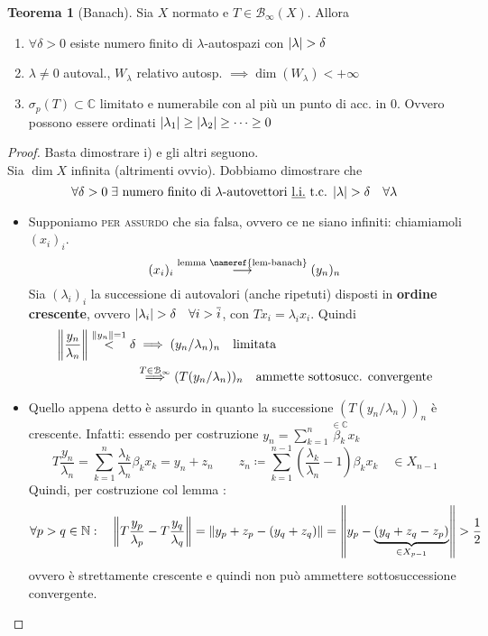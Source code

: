 \documentclass[a4paper,10pt]{article}
\theoremstyle{definition}
\newcommand{\na}{\mathbb{N}} %
\newcommand{\im}{\mathbb{C}} %
\newcommand{\noun}[1]{\textsc{#1}}
\theoremstyle{indentdefinition}
\theoremstyle{indenttheorem}
\newtheorem{thm}{Teorema}
\theoremstyle{myremark}
\theoremstyle{indentgeneral}
\newenvironment{myboxed} 
{\noindent\begin{lrbox}{\mybox}\begin{minipage}{\textwidth}}
{\end{minipage}\end{lrbox}\fbox{\usebox{\mybox}}}
\begin{document}
\begin{myboxed}
    \begin{thm}[Banach]\label{thm-banach}
        Sia $X$ normato e $T\in\mathcal{B}_\infty(X)$. Allora
        \begin{enumerate}
            \item $\forall\delta>0$ esiste numero finito di $\lambda$-autospazi con $\abs{\lambda}>\delta$
            \item $\lambda\ne 0$ autoval., $W_\lambda$ relativo autosp. $\implies \dim(W_\lambda)<+\infty$
            \item $\sigma_p(T)\subset \im$ limitato e numerabile con al più un punto di acc. in 0. Ovvero possono essere ordinati $\abs{\lambda_1}\ge\abs{\lambda_2}\ge\dots\ge 0$
        \end{enumerate}
    \end{thm}
\end{myboxed}

\begin{proof} Basta dimostrare i) e gli altri seguono. \\
     Sia $\dim X$ infinita (altrimenti ovvio). Dobbiamo dimostrare che
        $$\forall\delta>0\;\exists \text{  numero finito di $\lambda$-autovettori \underline{l.i.} t.c. }\abs{\lambda}>\delta\quad \forall\lambda$$
        \begin{itemize}
            \item  Supponiamo \noun{per assurdo} che sia falsa, ovvero ce ne siano infiniti: chiamiamoli $(x_i)_i$. 
        $$(x_i)_i\overset{\text{lemma \nameref{lem-banach}}}{\longrightarrow}(y_n)_n$$
        Sia $(\lambda_i)_i$ la successione di autovalori (anche ripetuti) disposti in \textbf{ordine crescente}, ovvero $\abs{\lambda_i}>\delta \quad \forall i>\overline{i}$, con 
$Tx_i=\lambda_ix_i$. Quindi
        \begin{align*}
            \norm{\frac{y_n}{\lambda_n}}\overset{\norm{y_n}=1}{<}\delta&\implies (y_n/\lambda_n)_n \quad \text{limitata}\\
            &\overset{T \in\mathcal{B}_\infty}{\implies} (T(y_n/\lambda_n))_n \quad \text{ammette sottosucc. convergente}
        \end{align*}
        \item Quello appena detto è assurdo in quanto la successione $(T(y_n/\lambda_n))_n$ è crescente. Infatti: essendo per costruzione $y_n=\sum_{k=1}^n\overset{\in \im}{\beta_k}x_k$
        $$T\frac{y_n}{\lambda_n}=\sum_{k=1}^n\frac{\lambda_k}{\lambda_n}\beta_kx_k=y_n+z_n \qquad z_n\coloneqq\sum_{k=1}^{n-1}\left(\frac{\lambda_k}{\lambda_n}-1\right)\beta_kx_k\quad\in X_{n-1}$$
        Quindi, per costruzione col lemma :
        $$\forall p>q\in\na:\quad \norm{T\frac{y_p}{\lambda_p}-T\frac{y_q}{\lambda_q}}=\norm{y_p+z_p-(y_q+z_q)}=\norm{y_p-\underbrace{(y_q+z_q-z_p)}_{\in X_{p-1}}}>\frac{1}{2}$$
        ovvero è strettamente crescente e quindi non può ammettere sottosuccessione convergente. \lightning
        \end{itemize}
\end{proof}
\end{document}
